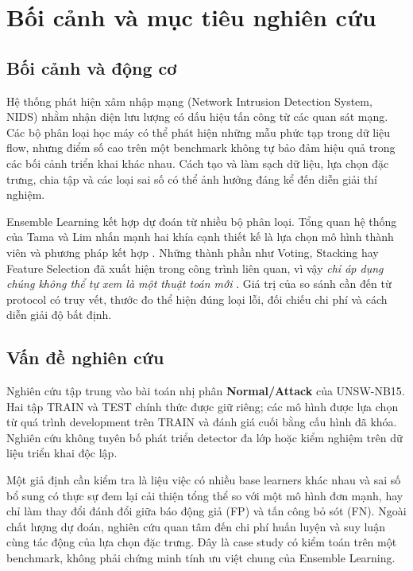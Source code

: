 \section{Bối cảnh và mục tiêu nghiên cứu}
\label{chap:gioi-thieu}

\subsection{Bối cảnh và động cơ}
Hệ thống phát hiện xâm nhập mạng (Network Intrusion Detection System, NIDS) nhằm nhận diện lưu lượng có dấu hiệu tấn công từ các quan sát mạng. Các bộ phân loại học máy có thể phát hiện những mẫu phức tạp trong dữ liệu flow, nhưng điểm số cao trên một benchmark không tự bảo đảm hiệu quả trong các bối cảnh triển khai khác nhau. Cách tạo và làm sạch dữ liệu, lựa chọn đặc trưng, chia tập và các loại sai số có thể ảnh hưởng đáng kể đến diễn giải thí nghiệm.

Ensemble Learning kết hợp dự đoán từ nhiều bộ phân loại. Tổng quan hệ thống của Tama và Lim nhấn mạnh hai khía cạnh thiết kế là lựa chọn mô hình thành viên và phương pháp kết hợp \cite{legacyL01}. Những thành phần như Voting, Stacking hay Feature Selection đã xuất hiện trong công trình liên quan, vì vậy \emph{chỉ áp dụng chúng không thể tự xem là một thuật toán mới} \cite{legacyL04,legacyL05,legacyL06,legacyL12}. Giá trị của so sánh cần đến từ protocol có truy vết, thước đo thể hiện đúng loại lỗi, đối chiếu chi phí và cách diễn giải độ bất định.

\subsection{Vấn đề nghiên cứu}
Nghiên cứu tập trung vào bài toán nhị phân \textbf{Normal/Attack} của UNSW-NB15. Hai tập TRAIN và TEST chính thức được giữ riêng; các mô hình được lựa chọn từ quá trình development trên TRAIN và đánh giá cuối bằng cấu hình đã khóa. Nghiên cứu không tuyên bố phát triển detector đa lớp hoặc kiểm nghiệm trên dữ liệu triển khai độc lập.

Một giả định cần kiểm tra là liệu việc có nhiều base learners khác nhau và sai số bổ sung có thực sự đem lại cải thiện tổng thể so với một mô hình đơn mạnh, hay chỉ làm thay đổi đánh đổi giữa báo động giả (FP) và tấn công bỏ sót (FN). Ngoài chất lượng dự đoán, nghiên cứu quan tâm đến chi phí huấn luyện và suy luận cùng tác động của lựa chọn đặc trưng. Đây là case study có kiểm toán trên một benchmark, không phải chứng minh tính ưu việt chung của Ensemble Learning.

